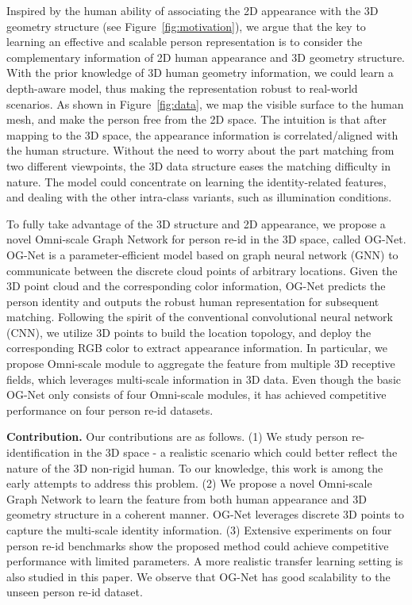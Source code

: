 Inspired by the human ability of associating the 2D appearance with the 3D geometry structure (see Figure~\ref{fig:motivation}), we argue that the key to learning an effective and scalable person representation is to consider the complementary information of 2D human appearance and 3D geometry structure. With the prior knowledge of 3D human geometry information, we could learn a depth-aware model, thus making the representation robust to real-world scenarios. As shown in Figure~\ref{fig:data}, we map the visible surface to the human mesh, and make the person free from the 2D space. 
The intuition is that after mapping to the 3D space, the appearance information is correlated/aligned with the human structure.
Without the need to worry about the part matching from two different viewpoints, the 3D data structure eases the matching difficulty in nature. The model could concentrate on learning the identity-related features, and dealing with the other intra-class variants, such as illumination conditions. 

To fully take advantage of the 3D structure and 2D appearance, we propose a novel Omni-scale Graph Network for person re-id in the 3D space, called OG-Net. OG-Net is a parameter-efficient model based on graph neural network (GNN) to communicate between the discrete cloud points of arbitrary locations. Given the 3D point cloud and the corresponding color information, OG-Net predicts the person identity and outputs the robust human representation for subsequent matching. 
Following the spirit of the conventional convolutional neural network (CNN), we utilize 3D points to build the location topology, and deploy the corresponding RGB color to extract appearance information.  In particular, we propose Omni-scale module to aggregate the feature from multiple 3D receptive fields, which leverages multi-scale information in 3D data. Even though the basic OG-Net only consists of four Omni-scale modules, it has achieved competitive performance on four person re-id datasets. 

\textbf{Contribution.} Our contributions are as follows. 
(1) We study person re-identification in the 3D space - a realistic scenario which could better reflect the nature of the 3D non-rigid human. To our knowledge, this work is among the early attempts to address this problem. (2) We propose a novel Omni-scale Graph Network to learn the feature from both human appearance and 3D geometry structure in a coherent manner. OG-Net leverages discrete 3D points to capture the multi-scale identity information. (3) Extensive experiments on four person re-id benchmarks show the proposed method could achieve competitive performance with limited parameters. A more realistic transfer learning setting is also studied in this paper. We observe that OG-Net has good scalability to the unseen person re-id dataset. 

